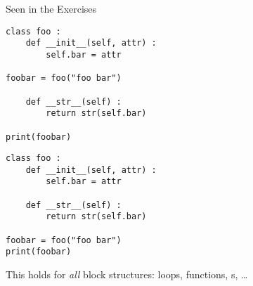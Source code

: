 \begin{frame}[fragile]{Seen in the Exercises}
%
\begin{tcbraster}[raster columns=2,
                  raster equal height,
                  nobeforeafter,
                  raster column skip=0.5cm]
\begin{warnbox}[Example: Interupted Blocks, leftupper=6mm]
\begin{verbatim}
class foo :
    def __init__(self, attr) :
        self.bar = attr

foobar = foo("foo bar")

    def __str__(self) :
        return str(self.bar)

print(foobar)
\end{verbatim}
\end{warnbox}
%
\begin{codebox}
\begin{verbatim}
class foo :
    def __init__(self, attr) :
        self.bar = attr

    def __str__(self) :
        return str(self.bar)

foobar = foo("foo bar")
print(foobar)
\end{verbatim}
\end{codebox}
\end{tcbraster}
%
\begin{hintbox}[Hint]
This holds for \emph{all} block structures: loops, functions, s, \ldots
\end{hintbox}
%
\end{frame}


